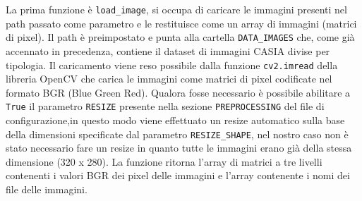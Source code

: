 La prima funzione è \texttt{load\_image}, si occupa di caricare le immagini presenti nel path passato come parametro e le restituisce come un array di immagini (matrici di pixel). Il path è preimpostato e punta alla cartella \texttt{DATA\_IMAGES} che, come già accennato in precedenza, contiene il dataset di immagini CASIA divise per tipologia. Il caricamento viene reso possibile dalla funzione \texttt{cv2.imread} della libreria OpenCV che carica le immagini come matrici di pixel codificate nel formato BGR (Blue Green Red). Qualora fosse necessario è possibile abilitare a \texttt{True} il parametro \texttt{RESIZE} presente nella sezione \texttt{PREPROCESSING} del file di configurazione,in questo modo viene effettuato un resize automatico sulla base della dimensioni specificate dal parametro \texttt{RESIZE\_SHAPE}, nel nostro caso non è stato necessario fare un resize in quanto tutte le immagini erano già della stessa dimensione (320 x  280). La funzione ritorna l’array di matrici a tre livelli contenenti i valori BGR dei pixel delle immagini e l’array contenente i nomi dei file delle immagini.
